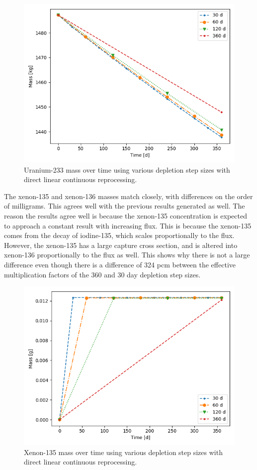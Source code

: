 \begin{figure}[H]
  \centering
  \includegraphics[scale=0.7]{images/DL_NSTEP_U-233_mass-large.png}
  \caption{Uranium-233 mass over time using various depletion step sizes with direct linear continuous reprocessing.}
   \label{fig:DL-cont-u-2}
\end{figure}

The xenon-135 and xenon-136 masses match closely, with differences on the order of milligrams. This agrees well with the previous results generated as well. The reason the results agree well is because the xenon-135 concentration is expected to approach a constant result with increasing flux. This is because the xenon-135 comes from the decay of iodine-135, which scales proportionally to the flux. However, the xenon-135 has a large capture cross section, and is altered into xenon-136 proportionally to the flux as well. This shows why there is not a large difference even though there is a difference of 324 pcm between the effective multiplication factors of the 360 and 30 day depletion step sizes.

\begin{figure}[H]
  \centering
  \includegraphics[scale=0.7]{images/DL_NSTEP_Xe-135_mass-large.png}
  \caption{Xenon-135 mass over time using various depletion step sizes with direct linear continuous reprocessing.}
   \label{fig:DL-cont-xe135-2}
\end{figure}

